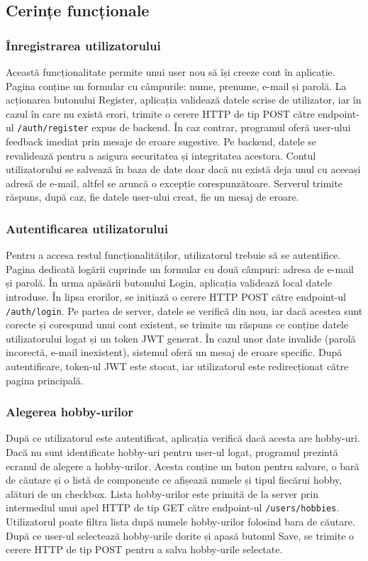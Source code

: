 \subsection{Cerințe funcționale}
\label{subsec:ch4sec2sub1}

\subsubsection*{Înregistrarea utilizatorului}
Această funcționalitate permite unui user nou să își creeze cont în aplicație. 
Pagina conține un formular cu câmpurile: nume, prenume, e-mail și parolă.
La acționarea butonului Register, aplicația validează datele scrise de utilizator, iar în cazul în care
nu există erori, trimite o cerere HTTP de tip POST către endpoint-ul \texttt{/auth/register} expus de backend. 
În caz contrar, programul oferă user-ului feedback imediat prin mesaje de eroare sugestive.
Pe backend, datele se revalidează pentru a asigura securitatea și integritatea acestora. 
Contul utilizatorului se salvează în baza de date doar dacă nu există deja unul cu aceeași adresă de e-mail, altfel se aruncă o excepție corespunzătoare.
Serverul trimite răspuns, după caz, fie datele user-ului creat, fie un mesaj de eroare.

\subsubsection*{Autentificarea utilizatorului}
Pentru a accesa restul funcționalităților, utilizatorul trebuie să se autentifice. Pagina dedicată logării cuprinde un formular cu două câmpuri: adresa de e-mail și parolă.
În urma apăsării butonului Login, aplicația validează local datele introduse. În lipsa erorilor, se inițiază o cerere HTTP POST către endpoint-ul \texttt{/auth/login}.
Pe partea de server, datele se verifică din nou, iar dacă acestea sunt corecte și corespund unui cont existent, se trimite un răspuns ce conține datele utilizatorului logat și un token JWT generat.
În cazul unor date invalide (parolă incorectă, e-mail inexistent), sistemul oferă un mesaj de eroare specific. După autentificare, token-ul JWT este stocat, iar utilizatorul este redirecționat către pagina principală.


\subsubsection*{Alegerea hobby-urilor}
După ce utilizatorul este autentificat, aplicația verifică dacă acesta are hobby-uri. Dacă nu sunt identificate hobby-uri pentru user-ul logat, programul prezintă
ecranul de alegere a hobby-urilor. Acesta conține un buton pentru salvare, o bară de căutare și o listă de componente ce afișează numele și tipul fiecărui hobby, alături de un checkbox.
Lista hobby-urilor este primită de la server prin intermediul unui apel HTTP de tip GET către endpoint-ul \texttt{/users/hobbies}. 
Utilizatorul poate filtra lista după numele hobby-urilor folosind bara de căutare. 
După ce user-ul selectează hobby-urile dorite și apasă butonul Save, se trimite o cerere HTTP de tip POST pentru a salva hobby-urile selectate.

